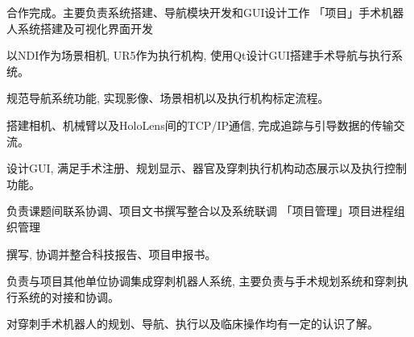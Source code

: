 \begin{cventries}
  \cventry
    {合作完成。主要负责系统搭建、导航模块开发和GUI设计工作}%
    {「项目」手术机器人系统搭建及可视化界面开发}  %
    {} %
    {} %
    {      
      \begin{cvitems} %
        \item{以NDI作为场景相机, UR5作为执行机构, 使用Qt设计GUI搭建手术导航与执行系统。}
        \item{规范导航系统功能, 实现影像、场景相机以及执行机构标定流程。}
        \item{搭建相机、机械臂以及HoloLens间的TCP/IP通信, 完成追踪与引导数据的传输交流。}
        \item{设计GUI, 满足手术注册、规划显示、器官及穿刺执行机构动态展示以及执行控制功能。}
      \end{cvitems}
    }

    \cventry
    {负责课题间联系协调、项目文书撰写整合以及系统联调}%
    {「项目管理」项目进程组织管理}  %
    {} %
    {} %
    {      
      \begin{cvitems} %
        \item{撰写, 协调并整合科技报告、项目申报书。}
        \item{负责与项目其他单位协调集成穿刺机器人系统, 主要负责与手术规划系统和穿刺执行系统的对接和协调。}
        \item{对穿刺手术机器人的规划、导航、执行以及临床操作均有一定的认识了解。}
      \end{cvitems}
    }


\end{cventries}
